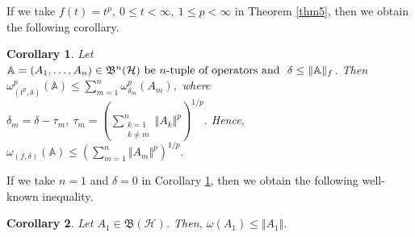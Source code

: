 \documentclass[12pt]{article}
\newtheorem{corollary}{Corollary}
\begin{document}
If we take $ f(t)=t^{p}, \ 0\leq t <\infty, \ 1\leq p <\infty $ in Theorem \ref{thm5}, then we obtain the following corollary.
\begin{corollary}
\label{cor7}
Let \( \mathbb{A} = (A_1, \ldots, A_n) \in \mathfrak{B}^{n}(\mathcal{H})$ be $n$-tuple of operators and $ \ \delta\leq \Vert \mathbb{A} \Vert_{f} \). Then
\(
\omega_{(t^{p},\delta )}^{p}(\mathbb{A}) \leq \sum\limits_{m=1}^{n} \omega_{\delta_{m}}^{p}(A_{m}),
\)
where $ \delta_{m}=\delta -\tau_{m}, \ \tau_{m}=\left( \sum\limits_{\substack{k=1 \\ k\neq m}}^{n} \Vert A_{k} \Vert^{p}\right) ^{1/p}. $
Hence,
\(
\omega_{(f,\delta )}(\mathbb{A}) \leq \left( \sum\limits_{m=1}^{n} \Vert A_{m} \Vert^{p}\right)^{1/p} .
\)
\end{corollary}

If we take $ n=1 $ and $ \delta=0 $ in Corollary \ref{cor7}, then we obtain the following well-known inequality.
\begin{corollary}
\label{cor8}
Let $  A_1 \in \mathfrak{B}(\mathcal{H})$. Then,
\(
\omega (A_{1})\leq \Vert A_{1} \Vert.
\)
\end{corollary}
\end{document}

